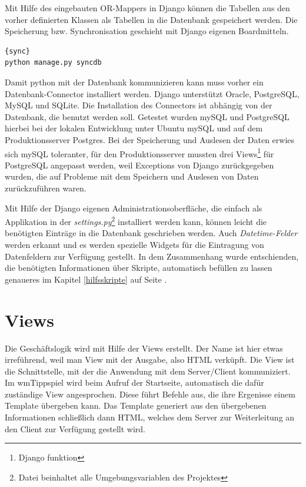 \documentclass[titlepage, 12pt,a4paper]{scrartcl}
\begin{document}
Mit Hilfe des eingebauten OR-Mappers in Django können die Tabellen aus den
vorher definierten Klassen als Tabellen in die Datenbank gespeichert werden.
Die Speicherung bzw. Synchronisation geschieht mit Django eigenen Boardmitteln.

\begin{lstlisting}[caption=Datenbanksynchronisation]{sync}
python manage.py syncdb
\end{lstlisting}

Damit python mit der Datenbank kommunizieren kann muss vorher ein
Datenbank-Connector installiert werden. Django unterstützt Oracle, PostgreSQL,
MySQL und SQLite. Die Installation des Connectors ist abhängig von der
Datenbank, die benutzt werden soll. Getestet wurden mySQL und PostgreSQL
hierbei bei der lokalen Entwicklung unter Ubuntu mySQL und auf dem
Produktionsserver Postgres. Bei der Speicherung und Auslesen der Daten erwies
sich mySQL toleranter, für den Produktionsserver mussten drei
Views\footnote{Django funktion} für PostgreSQL angepasst werden, weil
Exceptions von Django zurückgegeben wurden, die auf Probleme mit dem Speichern
und Auslesen von Daten zurückzuführen waren.

Mit Hilfe der Django eigenen Administrationsoberfläche, die einfach als
Applikation in der \emph{settings.py}\footnote{Datei beinhaltet alle
Umgebungsvariablen des Projektes} installiert werden kann, können leicht die
benötigten Einträge in die Datenbank geschrieben werden. Auch
\emph{Datetime-Felder} werden erkannt und es werden spezielle Widgets für die
Eintragung von Datenfeldern zur Verfügung gestellt. In dem Zusammenhang wurde
entschienden, die benötigten Informationen über Skripte, automatisch befüllen zu
lassen genaueres im Kapitel \ref{hilfsskripte} auf Seite \pageref{hilfsskripte}. 



\section{Views}
Die Geschäftslogik wird mit Hilfe der Views erstellt. Der Name ist hier etwas
irreführend, weil man View mit der Ausgabe, also HTML verküpft. Die View ist die
Schnittstelle, mit der die Anwendung mit dem Server/Client kommuniziert. Im
wmTippspiel wird beim Aufruf der Startseite, automatisch die dafür zuständige
View angesprochen. Diese führt Befehle aus, die ihre Ergenisse einem Template
übergeben kann. Das Template generiert aus den übergebenen Informationen
schließlich dann HTML, welches dem Server zur Weiterleitung an den Client zur
Verfügung gestellt wird.
\end{document}
